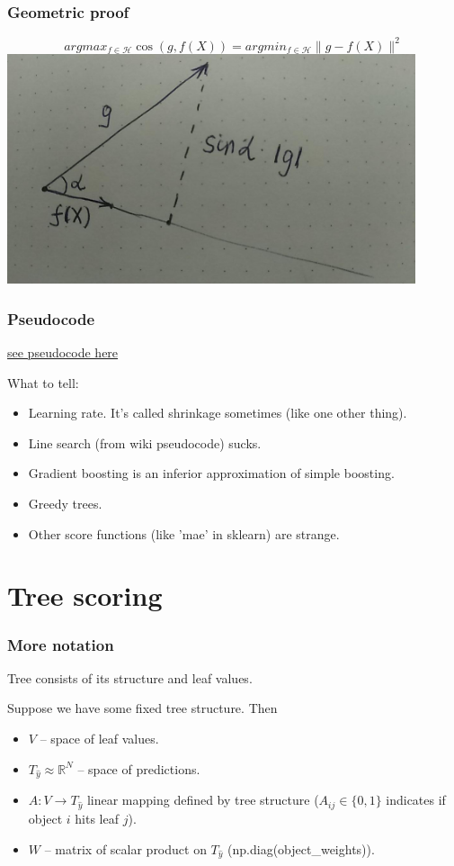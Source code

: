 \documentclass{beamer}
\begin{document}
\begin{frame}
\frametitle{Geometric proof}

$$argmax_{f\in \mathcal{H}} \cos(g, f(X)) = argmin_{f\in \mathcal{H}} \|g - f(X) \|^2 $$
\includegraphics[width=120mm]{cos_mse_equivalence.jpg}

\end{frame}

\begin{frame}[fragile]
\frametitle{Pseudocode}
\href{https://en.wikipedia.org/wiki/Gradient_boosting#Algorithm}{see pseudocode here} \par
What to tell:
\begin{itemize}
	\item Learning rate. It's called shrinkage sometimes (like one other thing).
	\item Line search (from wiki pseudocode) sucks.
	\item Gradient boosting is an inferior approximation of simple boosting.
	\item Greedy trees.
	\item Other score functions (like 'mae' in sklearn) are strange.
\end{itemize}
\end{frame}

\section{Tree scoring}

\begin{frame}
\frametitle{More notation}
Tree consists of its structure and leaf values. \par
Suppose we have some fixed tree structure. Then \par
\begin{itemize}
	\item $V$ -- space of leaf values.
	\item $T_{\hat y} \approx \mathbb{R}^N$ -- space of predictions.
	\item $A: V \to T_{\hat y}$ linear mapping defined by tree structure ($A_{ij} \in\{0, 1\}$ indicates if object $i$ hits leaf $j$).
	\item $W$ -- matrix of scalar product on $T_{\hat y}$ (np.diag(object\_weights)).
\end{itemize}
\end{frame}
\end{document}
